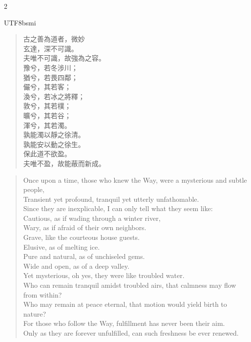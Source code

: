 \begin{paracol}{2}
\begin{CJK*}{UTF8}{bsmi}
\begin{verse}
古之善為道者，微妙\\
玄達，深不可識。\\
夫唯不可識，故強為之容。\\
豫兮，若冬涉川；\\
猶兮，若畏四鄰；\\
儼兮，其若客；\\
渙兮，若冰之將釋；\\
敦兮，其若樸；\\
曠兮，其若谷；\\
渾兮，其若濁。\\
孰能濁以靜之徐清。\\
孰能安以動之徐生。\\
保此道不欲盈。\\
夫唯不盈，故能蔽而新成。
\end{verse}
\end{CJK*}
\switchcolumn
\begin{verse}
Once upon a time, those who knew the Way, were a mysterious and subtle people,\\
Transient yet profound, tranquil yet utterly unfathomable.\\
Since they are inexplicable, I can only tell what they seem like:\\
Cautious, as if wading through a winter river,\\
Wary, as if afraid of their own neighbors.\\
Grave, like the courteous house guests.\\
Elusive, as of melting ice.\\
Pure and natural, as of unchiseled gems.\\
Wide and open, as of a deep valley.\\
Yet mysterious, oh yes, they were like troubled water.\\
Who can remain tranquil amidst troubled airs, that calmness may flow from within?\\
Who may remain at peace eternal, that motion would yield birth to nature?\\
For those who follow the Way, fulfillment has never been their aim.\\
Only as they are forever unfulfilled, can such freshness be ever renewed.
\end{verse}
\end{paracol}


